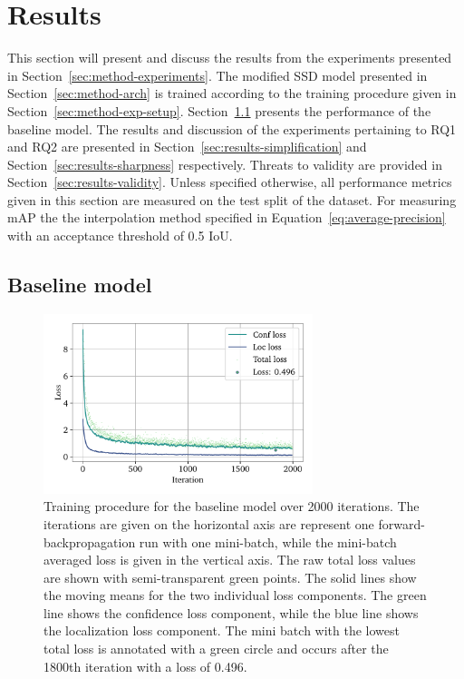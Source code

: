 \chapter{Results}\label{cha:results}

This section will present and discuss the results from the experiments presented in Section~\ref{sec:method-experiments}.
The modified SSD model presented in Section~\ref{sec:method-arch} is trained according to the training procedure given in Section~\ref{sec:method-exp-setup}.
Section~\ref{sec:results-baseline} presents the performance of the baseline model.
The results and discussion of the experiments pertaining to RQ1 and RQ2 are presented in Section~\ref{sec:results-simplification} and Section~\ref{sec:results-sharpness} respectively.
Threats to validity are provided in Section~\ref{sec:results-validity}.
Unless specified otherwise, all performance metrics given in this section are measured on the test split of the dataset.
For measuring mAP the the interpolation method specified in Equation~\ref{eq:average-precision} with an acceptance threshold of 0.5 IoU.

\section{Baseline model}\label{sec:results-baseline}
\begin{figure}[htbp]
    \centering
    \includegraphics[width=0.7\textwidth]{figs/results/baseline/loss2.pdf}
    \caption[Baseline training procedure]{%
Training procedure for the baseline model over 2000 iterations.
The iterations are given on the horizontal axis are represent one forward-backpropagation run with one mini-batch, while the mini-batch averaged loss is given in the vertical axis.
The raw total loss values are shown with semi-transparent green points.
The solid lines show the moving means for the two individual loss components.
The green line shows the confidence loss component, while the blue line shows the localization loss component.
The mini batch with the lowest total loss is annotated with a green circle and occurs after the 1800th iteration with a loss of 0.496.
    }\label{fig:method-baseline-loss}
  \end{figure}

